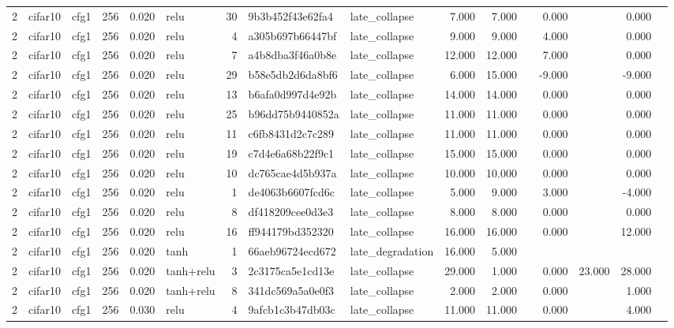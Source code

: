 \begin{table}[htbp]
{\begin{tabular}{@{}rllrrlrllrrrrrrr@{}}
2 & cifar10 & cfg1 & 256 & 0.020 & relu & 30 & 9b3b452f43e62fa4 & late\_collapse & 7.000 & 7.000 &  & 0.000 &  & 0.000 &  \\
2 & cifar10 & cfg1 & 256 & 0.020 & relu & 4 & a305b697b66447bf & late\_collapse & 9.000 & 9.000 &  & 4.000 &  & 0.000 &  \\
2 & cifar10 & cfg1 & 256 & 0.020 & relu & 7 & a4b8dba3f46a0b8e & late\_collapse & 12.000 & 12.000 &  & 7.000 &  & 0.000 &  \\
2 & cifar10 & cfg1 & 256 & 0.020 & relu & 29 & b58e5db2d6da8bf6 & late\_collapse & 6.000 & 15.000 &  & -9.000 &  & -9.000 &  \\
2 & cifar10 & cfg1 & 256 & 0.020 & relu & 13 & b6afa0d997d4e92b & late\_collapse & 14.000 & 14.000 &  & 0.000 &  & 0.000 &  \\
2 & cifar10 & cfg1 & 256 & 0.020 & relu & 25 & b96dd75b9440852a & late\_collapse & 11.000 & 11.000 &  & 0.000 &  & 0.000 &  \\
2 & cifar10 & cfg1 & 256 & 0.020 & relu & 11 & c6fb8431d2c7c289 & late\_collapse & 11.000 & 11.000 &  & 0.000 &  & 0.000 &  \\
2 & cifar10 & cfg1 & 256 & 0.020 & relu & 19 & c7d4e6a68b22f9c1 & late\_collapse & 15.000 & 15.000 &  & 0.000 &  & 0.000 &  \\
2 & cifar10 & cfg1 & 256 & 0.020 & relu & 10 & dc765cae4d5b937a & late\_collapse & 10.000 & 10.000 &  & 0.000 &  & 0.000 &  \\
2 & cifar10 & cfg1 & 256 & 0.020 & relu & 1 & de4063b6607fcd6c & late\_collapse & 5.000 & 9.000 &  & 3.000 &  & -4.000 &  \\
2 & cifar10 & cfg1 & 256 & 0.020 & relu & 8 & df418209cee0d3e3 & late\_collapse & 8.000 & 8.000 &  & 0.000 &  & 0.000 &  \\
2 & cifar10 & cfg1 & 256 & 0.020 & relu & 16 & ff944179bd352320 & late\_collapse & 16.000 & 16.000 &  & 0.000 &  & 12.000 &  \\
2 & cifar10 & cfg1 & 256 & 0.020 & tanh & 1 & 66aeb96724ecd672 & late\_degradation & 16.000 & 5.000 &  &  &  &  &  \\
2 & cifar10 & cfg1 & 256 & 0.020 & tanh+relu & 3 & 2c3175ca5e1cd13e & late\_collapse & 29.000 & 1.000 &  & 0.000 & 23.000 & 28.000 &  \\
2 & cifar10 & cfg1 & 256 & 0.020 & tanh+relu & 8 & 341dc569a5a0e0f3 & late\_collapse & 2.000 & 2.000 &  & 0.000 &  & 1.000 &  \\
2 & cifar10 & cfg1 & 256 & 0.030 & relu & 4 & 9afcb1c3b47db03c & late\_collapse & 11.000 & 11.000 &  & 0.000 &  & 4.000 &  \\

\end{tabular}}
\end{table}
